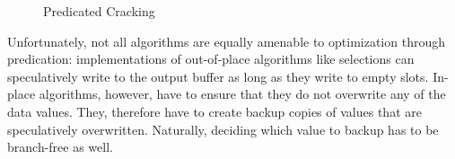 \begin{figure}[h]



  \caption{Predicated Cracking}
  \label{fig:predicated-cracking}
\end{figure}


Unfortunately, not all algorithms are equally amenable to
optimization through predication: implementations of out-of-place
algorithms like selections can speculatively write to the output
buffer as long as they write to empty slots. In-place algorithms,
however, have to ensure that they do not overwrite any of the data
values. They, therefore have to create backup copies of values
that are speculatively overwritten. Naturally, deciding which value
to backup has to be branch-free as well.


